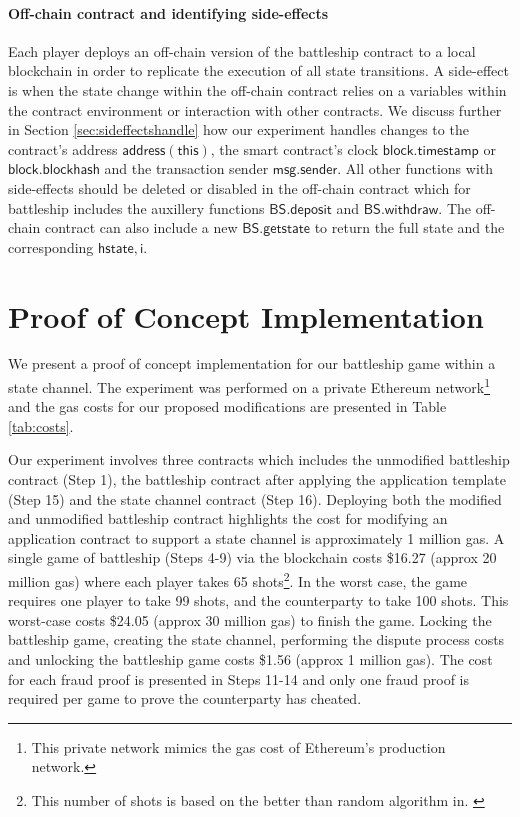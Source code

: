 \documentclass{llncs}
\newcommand{\instantiatedyes}{\mathsf{YES}}
\newcommand{\hstate}{\mathsf{hstate}}
\newcommand{\monotoniccounter}{\mathsf{i}}
\newcommand{\battleshipdeposit}{\mathsf{BS.deposit}}
\newcommand{\battleshipwithdraw}{\mathsf{BS.withdraw}}
\newcommand{\battleshipgetstate}{\mathsf{BS.getstate}}
\begin{document}
\paragraph{Off-chain contract and identifying side-effects} \label{sec:timers}

Each player deploys an off-chain version of the battleship contract to a local blockchain in order to replicate the execution of all state transitions. 
A side-effect is when the state change within the off-chain contract relies on a variables within the contract environment or interaction with other contracts.
We discuss further in Section \ref{sec:sideffectshandle} how our experiment handles changes to the contract's address $\mathsf{address(this)}$, the smart contract's clock $\mathsf{block.timestamp}$ or $\mathsf{block.blockhash}$ and the transaction sender $\mathsf{msg.sender}$. 
All other functions with side-effects should be deleted or disabled in the off-chain contract which for battleship includes the auxillery functions $\battleshipdeposit$ and $\battleshipwithdraw$. 
The off-chain contract can also include a new $\battleshipgetstate$ to return the full state and the corresponding $\hstate,\monotoniccounter$. 

\section{Proof  of Concept Implementation}

We present a proof of concept implementation for our battleship game within a state channel.
The experiment was performed on a private Ethereum network\footnote{This private network mimics the gas cost of Ethereum's production network.} and the gas costs for our proposed modifications are presented in Table \ref{tab:costs}. 

Our experiment involves three contracts which includes the unmodified battleship contract (Step 1), the battleship contract after applying the application template (Step 15) and the state channel contract (Step 16). 
Deploying both the modified and unmodified battleship contract highlights the cost for modifying an application contract to support a state channel is approximately 1 million gas. 
A single game of battleship (Steps 4-9) via the blockchain costs \$16.27 (approx 20 million gas) where each player takes 65 shots\footnote{This number of shots is based on the better than random algorithm in. \cite{battleshipdata}}.
In the worst case, the game requires one player to take 99 shots, and the counterparty to take 100 shots. 
This worst-case costs \$24.05 (approx 30 million gas) to finish the game.  
Locking the battleship game, creating the state channel, performing the dispute process costs and unlocking the battleship game costs \$1.56 (approx 1 million gas). 
The cost for each fraud proof is presented in Steps 11-14 and only one fraud proof is required per game to prove the counterparty has cheated. 
\end{document}
